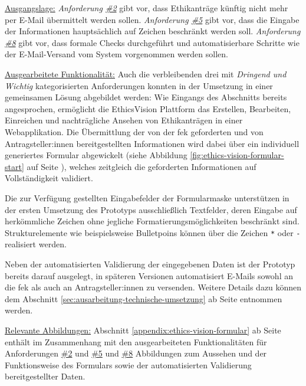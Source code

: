 \documentclass[a4paper,12pt,twoside,numbers=noendperiod]{scrreprt}
\begin{document}
\noindent\underline{Ausgangslage:} \textit{Anforderung \hyperref[sub-sub-sec:abgeleitete-anforderungen-während-erstellung-einreichung]{\#2}} gibt vor, dass Ethikanträge künftig nicht mehr per E-Mail übermittelt werden sollen. \textit{Anforderung \hyperref[sub-sub-sec:abgeleitete-anforderungen-während-erstellung-einreichung]{\#5}} gibt vor, dass die Eingabe der Informationen hauptsächlich auf Zeichen beschränkt werden soll. \textit{Anforderung \hyperref[sub-sub-sec:abgeleitete-anforderungen-nach-einreichung]{\#8}} gibt vor, dass formale Checks durchgeführt und automatisierbare Schritte wie der E-Mail-Versand vom System vorgenommen werden sollen.

\medskip

\noindent\underline{Ausgearbeitete Funktionalität:} Auch die verbleibenden drei mit \textit{Dringend und Wichtig} kategorisierten Anforderungen konnten in der Umsetzung in einer gemeinsamen Lösung abgebildet werden: Wie Eingangs des Abschnitts bereits angesprochen, ermöglicht die EthicsVision Plattform das Erstellen, Bearbeiten, Einreichen und nachträgliche Ansehen von Ethikanträgen in einer Webapplikation. Die Übermittlung der von der \ac{fek} geforderten und von Antragsteller:innen bereitgestellten Informationen wird dabei über ein individuell generiertes Formular abgewickelt (siehe Abbildung \ref{fig:ethics-vision-formular-start} auf Seite \pageref{fig:ethics-vision-formular-start}), welches zeitgleich die geforderten Informationen auf Vollständigkeit validiert.

Die zur Verfügung gestellten Eingabefelder der Formularmaske unterstützen in der ersten Umsetzung des Prototyps ausschließlich Textfelder, deren Eingabe auf herkömmliche Zeichen ohne jegliche Formatierungsmöglichkeiten beschränkt sind. Strukturelemente wie beispielsweise Bulletpoins können über die Zeichen \texttt{*} oder \texttt{-} realisiert werden.

Neben der automatisierten Validierung der eingegebenen Daten ist der Prototyp bereits darauf ausgelegt, in späteren Versionen automatisiert E-Mails sowohl an die \acl{fek} als auch an Antragsteller:innen zu versenden. Weitere Details dazu können dem Abschnitt \ref{sec:ausarbeitung-technische-umsetzung} ab Seite \pageref{sec:ausarbeitung-technische-umsetzung} entnommen werden.

\medskip

\noindent\underline{Relevante Abbildungen:} Abschnitt \ref{appendix:ethics-vision-formular} ab Seite \pageref{appendix:ethics-vision-formular} enthält im Zusammenhang mit den ausgearbeiteten Funktionalitäten für Anforderungen \hyperref[sub-sub-sec:abgeleitete-anforderungen-vorfeld-antrag]{\#2} und \hyperref[sub-sub-sec:abgeleitete-anforderungen-während-erstellung-einreichung]{\#5} und \hyperref[sub-sub-sec:abgeleitete-anforderungen-nach-einreichung]{\#8} Abbildungen zum Aussehen und der Funktionsweise des Formulars sowie der automatisierten Validierung bereitgestellter Daten.
\end{document}
